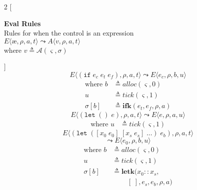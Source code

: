 \documentclass[12pt,draft]{article}
\newcommand\mae{\ensuremath{\text{\ae}}}
\newcommand{\ifsyn}[3]{(\texttt{if}\;#1\;#2\;#3)}
\begin{document}
\begin{multicols*}{2}
[
\begin{center}
\textbf{Eval Rules} \\
Rules for when the control is an expression \\
\vspace{15mm}
$E\langle \mae , \rho , a , t \rangle
\leadsto
A\langle v , \rho , a , t \rangle$ \\
where $v \triangleq \mathcal{A}(\varsigma, \sigma)$ \\
\vspace{-10mm}
\end{center}
]
\[
E\langle
\ifsyn{e_c}{e_t}{e_f} , \rho , a , t
\rangle
\leadsto
E\langle
e_c , \rho , b , u
\rangle
\]
\vspace{-13mm}
\begin{align*}
\text{where } b &\triangleq alloc(\varsigma, 0) \\
u &\triangleq tick(\varsigma, 1) \\
\sigma[b] &\triangleq \textbf{ifk}(e_t, e_f, \rho, a)
\end{align*}
\vspace{-5mm}
\[
E\langle
(\texttt{let}\;()\;e) , \rho , a , t
\rangle
\leadsto
E\langle
e , \rho , a , u
\rangle
\]
\vspace{-12mm}
\begin{align*}
\text{where } u &\triangleq tick(\varsigma, 1)
\end{align*}
\vspace{-5mm}
\[
E\langle
(\texttt{let}\;([x_0\;e_0]\;[x_s\;e_s]\;...)\;e_b) , \rho , a , t
\rangle
\]
\vspace{-7mm}
\[
\leadsto
E\langle
e_0 , \rho , b , u
\rangle
\]
\vspace{-11mm}
\begin{align*}
\text{where } b &\triangleq alloc(\varsigma, 0) \\
u &\triangleq tick(\varsigma, 1) \\
\sigma[b] &\triangleq \textbf{letk}(x_0::x_s, \\
&\;\;\;\;\;\;\;\; [\;], e_s, e_b, \rho, a)
\end{align*}
\vspace{-5mm}

\end{multicols*}
\end{document}
